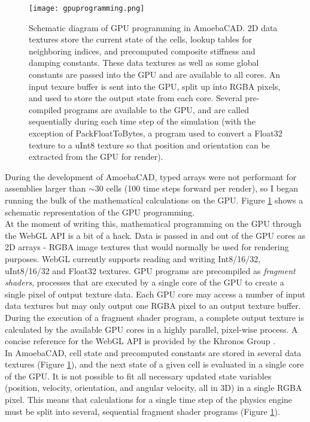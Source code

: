 {\begin{figure}
  \texttt{[image: gpuprogramming.png]}
  \caption{Schematic diagram of GPU programming in AmoebaCAD.  2D data textures store the current state of the cells, lookup tables for neighboring indices, and precomputed composite stiffness and damping constants.  These data textures as well as some global constants are passed into the GPU and are available to all cores.  An input texure buffer is sent into the GPU, split up into RGBA pixels, and used to store the output state from each core.  Several pre-compiled programs are available to the GPU, and are called sequentially during each time step of the simulation (with the exception of PackFloatToBytes, a program used to convert a Float32 texture to a uInt8 texture so that position and orientation can be extracted from the GPU for render).}
  \label{fig:gpuprogramming}
\end{figure}

During the development of AmoebaCAD, typed arrays were not performant for assemblies larger than $\sim$30 cells (100 time steps forward per render), so I began running the bulk of the mathematical calculations on the GPU.  Figure \ref{fig:gpuprogramming} shows a schematic representation of the GPU programming.\\

At the moment of writing this, mathematical programming on the GPU through the WebGL API is a bit of a hack.  Data is passed in and out of the GPU cores as 2D arrays - RGBA image textures that would normally be used for rendering purposes.  WebGL currently supports reading and writing Int8/16/32, uInt8/16/32 and Float32 textures.  GPU programs are precompiled as \textit{fragment shaders}, processes that are executed by a single core of the GPU to create a single pixel of output texture data.  Each GPU core may access a number of input data textures but may only output one RGBA pixel to an output texture buffer.  During the execution of a fragment shader program, a complete output texture is calculated by the available GPU cores in a highly parallel, pixel-wise process.  A concise reference for the WebGL API is provided by the Khronos Group \cite{Group}.\\

In AmoebaCAD, cell state and precomputed constants are stored in several data textures (Figure \ref{fig:gpuprogramming}), and the next state of a given cell is evaluated in a single core of the GPU.  It is not possible to fit all necessary updated state variables (position, velocity, orientation, and angular velocity, all in 3D) in a single RGBA pixel.  This means that calculations for a single time step of the physics engine must be split into several, sequential fragment shader programs (Figure \ref{fig:gpuprogramming}).\\

}
